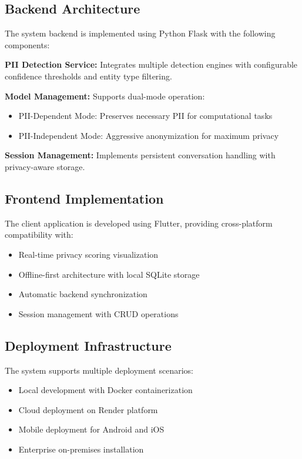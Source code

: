 \documentclass[conference]{IEEEtran}
\begin{document}
\subsection{Backend Architecture}

The system backend is implemented using Python Flask with the following components:

\textbf{PII Detection Service:} Integrates multiple detection engines with configurable confidence thresholds and entity type filtering.

\textbf{Model Management:} Supports dual-mode operation:
\begin{itemize}
\item PII-Dependent Mode: Preserves necessary PII for computational tasks
\item PII-Independent Mode: Aggressive anonymization for maximum privacy
\end{itemize}

\textbf{Session Management:} Implements persistent conversation handling with privacy-aware storage.

\subsection{Frontend Implementation}

The client application is developed using Flutter, providing cross-platform compatibility with:

\begin{itemize}
\item Real-time privacy scoring visualization
\item Offline-first architecture with local SQLite storage
\item Automatic backend synchronization
\item Session management with CRUD operations
\end{itemize}

\subsection{Deployment Infrastructure}

The system supports multiple deployment scenarios:
\begin{itemize}
\item Local development with Docker containerization
\item Cloud deployment on Render platform
\item Mobile deployment for Android and iOS
\item Enterprise on-premises installation
\end{itemize}
\end{document}
